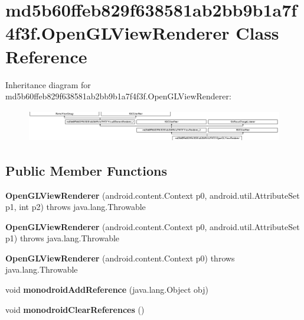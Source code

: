 \hypertarget{classmd5b60ffeb829f638581ab2bb9b1a7f4f3f_1_1OpenGLViewRenderer}{}\section{md5b60ffeb829f638581ab2bb9b1a7f4f3f.\+Open\+G\+L\+View\+Renderer Class Reference}
\label{classmd5b60ffeb829f638581ab2bb9b1a7f4f3f_1_1OpenGLViewRenderer}
Inheritance diagram for md5b60ffeb829f638581ab2bb9b1a7f4f3f.\+Open\+G\+L\+View\+Renderer\+:\begin{figure}[H]
\begin{center}
\leavevmode
\includegraphics[height=1.403509cm]{classmd5b60ffeb829f638581ab2bb9b1a7f4f3f_1_1OpenGLViewRenderer}
\end{center}
\end{figure}
\subsection*{Public Member Functions}
\begin{DoxyCompactItemize}
\item 
\mbox{\label{classmd5b60ffeb829f638581ab2bb9b1a7f4f3f_1_1OpenGLViewRenderer_a28f906bba65e6ae686fcd64c6f4d3c76}} 
{\bfseries Open\+G\+L\+View\+Renderer} (android.\+content.\+Context p0, android.\+util.\+Attribute\+Set p1, int p2)  throws java.\+lang.\+Throwable 	
\item 
\mbox{\label{classmd5b60ffeb829f638581ab2bb9b1a7f4f3f_1_1OpenGLViewRenderer_aacf21ab10c0a6caa88ed7d495cca1f55}} 
{\bfseries Open\+G\+L\+View\+Renderer} (android.\+content.\+Context p0, android.\+util.\+Attribute\+Set p1)  throws java.\+lang.\+Throwable 	
\item 
\mbox{\label{classmd5b60ffeb829f638581ab2bb9b1a7f4f3f_1_1OpenGLViewRenderer_aaf6cac6430c4b077a72790d407622dcb}} 
{\bfseries Open\+G\+L\+View\+Renderer} (android.\+content.\+Context p0)  throws java.\+lang.\+Throwable 	
\item 
\mbox{\label{classmd5b60ffeb829f638581ab2bb9b1a7f4f3f_1_1OpenGLViewRenderer_ac8094bbc57aebaa1cd453bac15ea5c5c}} 
void {\bfseries monodroid\+Add\+Reference} (java.\+lang.\+Object obj)
\item 
\mbox{\label{classmd5b60ffeb829f638581ab2bb9b1a7f4f3f_1_1OpenGLViewRenderer_aba5ec714afa8ec3c8390a6881dd96e13}} 
void {\bfseries monodroid\+Clear\+References} ()
\end{DoxyCompactItemize}
